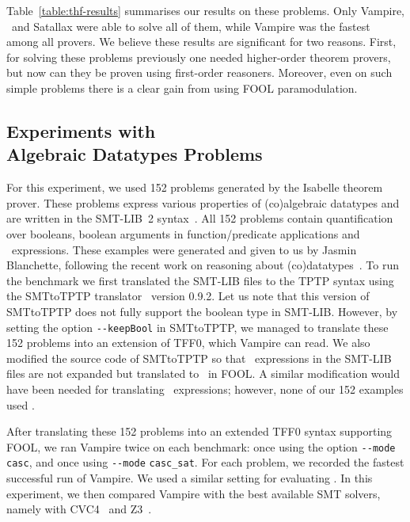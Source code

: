 Table~\ref{table:thf-results} summarises our results on these problems. Only Vampire, \nofoolVampire\ and Satallax were able to solve all of them, while
Vampire was the fastest among all provers. We believe these results
are significant for two reasons. First, for solving these problems
previously one 
needed higher-order theorem provers, but now can they be proven using first-order reasoners. Moreover, even on such simple problems there is a clear gain from using FOOL paramodulation.


\subsection[Experiments with Algebraic Datatypes Problems]{Experiments with\\Algebraic Datatypes Problems}
\label{subsec:Isabelle}

For this experiment, we used 152 problems generated by the Isabelle theorem prover. These
problems express various properties of (co)algebraic datatypes and are written in the SMT-LIB~2 syntax~\cite{SMT-LIB}. All 152 problems contain quantification over booleans, boolean arguments in function/predicate applications and \ITE\ expressions. These examples were generated and given to us by Jasmin Blanchette, following the recent work on reasoning about (co)datatypes~\cite{Blanchette15}. To run the benchmark we first translated the SMT-LIB files to the TPTP syntax using the SMTtoTPTP translator~\cite{SMTLIB2TPTP} version 0.9.2.
Let us note that this version of SMTtoTPTP does not fully support the
boolean type in SMT-LIB. However, by setting the option
\verb'--keepBool' in SMTtoTPTP, we managed to translate these 152
problems into an extension of TFF0, which Vampire can read.
We also modified the source code of  SMTtoTPTP so that  \ITE\
expressions in the SMT-LIB files are not expanded but translated to \dite\
in FOOL. A similar modification would have been needed for translating
\LETIN\ expressions; however, none of our 152 examples used \LETIN.

After translating these 152 problems into an extended TFF0 syntax
supporting FOOL, we ran Vampire twice on each benchmark: once using the
option \verb'--mode casc', and once using
\verb'--mode' \verb'casc_sat'.  For each problem, we recorded the
fastest successful run of Vampire. We used a similar setting for
evaluating \nofoolVampire.
In this experiment, we then compared Vampire with
the best available SMT solvers, namely with CVC4~\cite{CVC4} and
Z3~\cite{Z3}.

